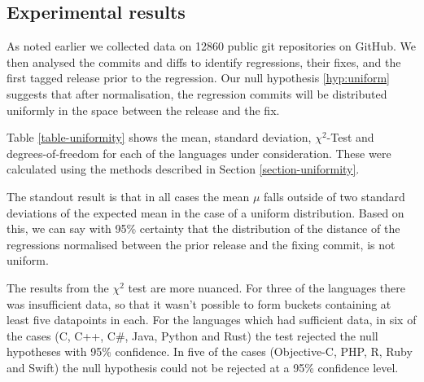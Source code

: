 \documentclass[10pt,journal,compsoc]{IEEEtran}
\begin{document}
\subsection{Experimental results}

As noted earlier we collected data on 12860 public git repositories on GitHub. We then analysed the commits and diffs to identify regressions, their fixes, and the first tagged release prior to the regression. Our null hypothesis \ref{hyp:uniform} suggests that after normalisation, the regression commits will be distributed uniformly in the space between the release and the fix.

Table \ref{table-uniformity} shows the mean, standard deviation, $\chi^2$-Test and degrees-of-freedom for each of the languages under consideration. These were calculated using the methods described in Section \ref{section-uniformity}.

The standout result is that in all cases the mean $\mu$ falls outside of two standard deviations of the expected mean in the case of a uniform distribution. Based on this, we can say with 95\% certainty that the distribution of the distance of the regressions normalised between the prior release and the fixing commit, is not uniform.

The results from the $\chi^2$ test are more nuanced. For three of the languages there was insufficient data, so that it wasn't possible to form buckets containing at least five datapoints in each. For the languages which had sufficient data, in six of the cases (C, C++, C\#, Java, Python and Rust) the test rejected the null hypotheses with 95\% confidence. In five of the cases (Objective-C, PHP, R, Ruby and Swift) the null hypothesis could not be rejected at a 95\% confidence level.
\end{document}
